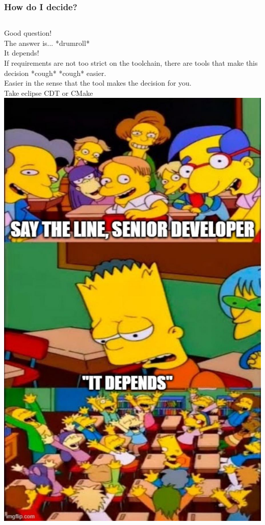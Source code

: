 \documentclass{beamer}
\begin{document}
\begin{frame}[fragile]
\frametitle{How do I decide?}
\begin{columns}
Good question!\\
The answer is... *drumroll* \\It depends! \\ \bigskip
If requirements are not too strict on the toolchain, there are tools that make this decision *cough* *cough* easier.\\ \bigskip
Easier in the sense that the tool makes the decision for you. \\
Take eclipse CDT or CMake \\
\includegraphics[scale=0.145]{figures/it-depends.jpg}
\end{columns}
\end{frame}
\end{document}
